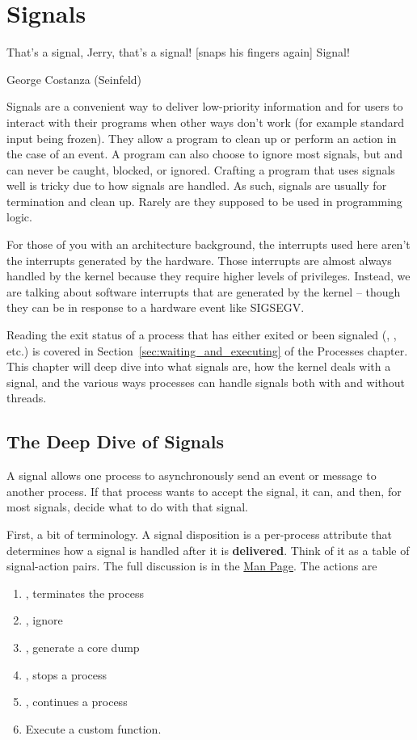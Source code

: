\chapter{Signals}

\epigraph{That's a signal, Jerry, that's a signal! [snaps his fingers again] Signal!}{George Costanza (Seinfeld)}

Signals are a convenient way to deliver low-priority information and for users to interact with their programs when other ways don't work (for example standard input being frozen).
They allow a program to clean up or perform an action in the case of an event.
A program can also choose to ignore most signals, but  and  can never be caught, blocked, or ignored.
Crafting a program that uses signals well is tricky due to how signals are handled.
As such, signals are usually for termination and clean up.
Rarely are they supposed to be used in programming logic.

For those of you with an architecture background, the interrupts used here aren't the interrupts generated by the hardware.
Those interrupts are almost always handled by the kernel because they require higher levels of privileges.
Instead, we are talking about software interrupts that are generated by the kernel -- though they can be in response to a hardware event like SIGSEGV.

Reading the exit status of a process that has either exited or been signaled (, , etc.) is covered in Section~\ref{sec:waiting_and_executing} of the Processes chapter.
This chapter will deep dive into what signals are, how the kernel deals with a signal, and the various ways processes can handle signals both with and without threads.

\section{The Deep Dive of Signals}

A signal allows one process to asynchronously send an event or message to another process.
If that process wants to accept the signal, it can, and then, for most signals, decide what to do with that signal.

First, a bit of terminology.
A signal disposition is a per-process attribute that determines how a signal is handled after it is \textbf{delivered}.
Think of it as a table of signal-action pairs.
The full discussion is in the \href{http://man7.org/linux/man-pages/man7/signal.7.html}{Man Page}.
The actions are
\begin{enumerate}
  \item {}, terminates the process
  \item {}, ignore
  \item {}, generate a core dump
  \item {}, stops a process
  \item {}, continues a process
  \item Execute a custom function.
\end{enumerate}

